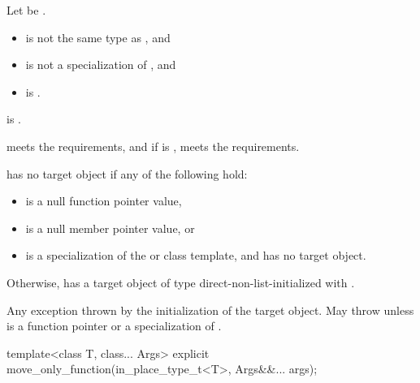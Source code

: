 \begin{itemdescr}
\pnum
Let  be .

\pnum
\constraints
\begin{itemize}
\item
{} is not the same type as , and
\item
{} is not a specialization of , and
\item
{} is .
\end{itemize}

\pnum
\mandates
{} is .

\pnum
\expects
{} meets the  requirements, and
if  is ,
 meets the  requirements.

\pnum
\ensures
{} has no target object if any of the following hold:
\begin{itemize}
\item
{} is a null function pointer value,
\item
{} is a null member pointer value, or
\item
{} is a specialization of
the  or  class template,
and  has no target object.
\end{itemize}
Otherwise,  has a target object of type 
direct-non-list-initialized with .

\pnum
\throws
Any exception thrown by the initialization of the target object.
May throw  unless  is
a function pointer or a specialization of .
\end{itemdescr}

%
\begin{itemdecl}
template<class T, class... Args>
  explicit move_only_function(in_place_type_t<T>, Args&&... args);
\end{itemdecl}

